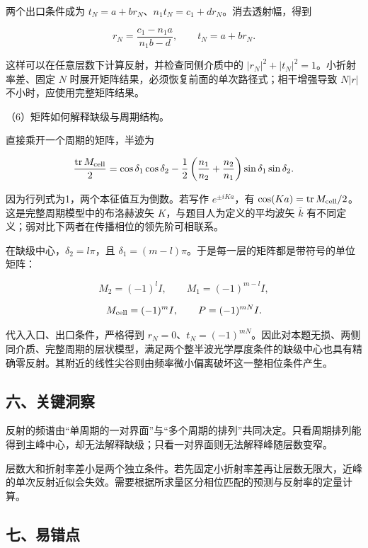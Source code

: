 \documentclass[12pt,a4paper,fontset=fandol]{ctexart}
\begin{document}
两个出口条件成为 \(t_N=a+br_N\)、\(n_1t_N=c_1+dr_N\)。消去透射幅，得到

\[
r_N=\frac{c_1-n_1a}{n_1b-d},\qquad
t_N=a+br_N.
\]

这样可以在任意层数下计算反射，并检查同侧介质中的
\(|r_N|^2+|t_N|^2=1\)。小折射率差、固定 \(N\)
时展开矩阵结果，必须恢复前面的单次路径式；相干增强导致 \(N|r|\)
不小时，应使用完整矩阵结果。

（6）矩阵如何解释缺级与周期结构。

直接乘开一个周期的矩阵，半迹为

\[
\frac{\operatorname{tr}M_{\rm cell}}2
=\cos\delta_1\cos\delta_2
-\frac12\left(\frac{n_1}{n_2}+\frac{n_2}{n_1}\right)
\sin\delta_1\sin\delta_2.
\]

因为行列式为1，两个本征值互为倒数。若写作 \(e^{\pm iKa}\)，有
\(\cos(Ka)=\operatorname{tr}M_{\rm cell}/2\)。这是完整周期模型中的布洛赫波矢
\(K\)，与题目人为定义的平均波矢 \(\bar k\)
有不同定义；弱对比下两者在传播相位的领先阶可相联系。

在缺级中心，\(\delta_2=l\pi\)，且
\(\delta_1=(m-l)\pi\)。于是每一层的矩阵都是带符号的单位矩阵：

\[
M_2=(-1)^lI,\qquad M_1=(-1)^{m-l}I,
\]

\[
M_{\rm cell}=(-1)^mI,\qquad P=(-1)^{mN}I.
\]

代入入口、出口条件，严格得到
\(r_N=0\)、\(t_N=(-1)^{mN}\)。因此对本题无损、两侧同介质、完整周期的层状模型，满足两个整半波光学厚度条件的缺级中心也具有精确零反射。其附近的线性尖谷则由频率微小偏离破坏这一整相位条件产生。

\subsection{六、关键洞察}\label{ux516dux5173ux952eux6d1eux5bdf-6}

反射的频谱由``单周期的一对界面''与``多个周期的排列''共同决定。只看周期排列能得到主峰中心，却无法解释缺级；只看一对界面则无法解释峰随层数变窄。

层数大和折射率差小是两个独立条件。若先固定小折射率差再让层数无限大，近峰的单次反射近似会失效。需要根据所求量区分相位匹配的预测与反射率的定量计算。

\subsection{七、易错点}\label{ux4e03ux6613ux9519ux70b9-6}
\end{document}
